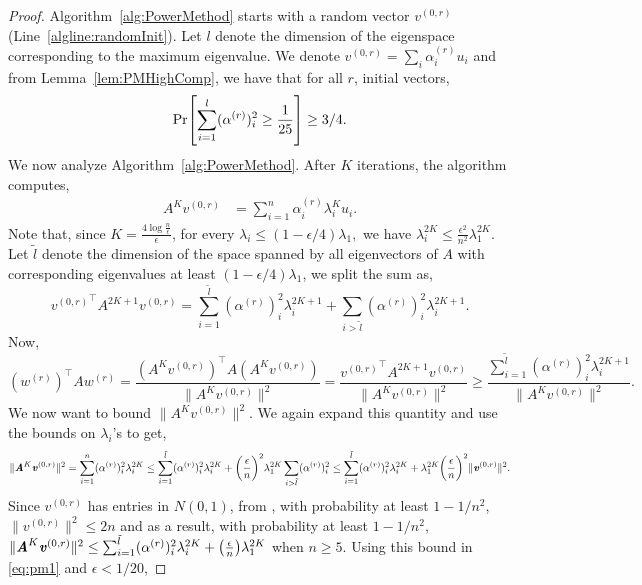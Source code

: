 \documentclass[11pt]{article}
\let\originalleft\left
\let\originalright\right
\renewcommand{\left}{\mathopen{}\mathclose\bgroup\originalleft}
\renewcommand{\right}{\aftergroup\egroup\originalright}
\newcommand\uu{\boldsymbol{\mathit{u}}}
\newcommand\vv{\boldsymbol{\mathit{v}}}
\newcommand\ww{\boldsymbol{\mathit{w}}}
\renewcommand\AA{\boldsymbol{\mathit{A}}}
\begin{document}
\PowerMethod*
\begin{proof}

Algorithm~\ref{alg:PowerMethod} starts with a random vector $\vv^{(0,r)}$ (Line~\ref{algline:randomInit}). Let $l$ denote the dimension of the eigenspace corresponding to the maximum eigenvalue. We denote $\vv^{(0,r)} = \sum_i \alpha^{(r)}_i \uu_i$ and from Lemma~\ref{lem:PMHighComp}, we have that for all $r$, initial vectors,
\[
\Pr\left[\sum_{i=1}^l(\alpha^{(r)})_i^2 \geq \frac{1}{25}\right]\geq 3/4.
\]
We now analyze Algorithm~\ref{alg:PowerMethod}. After $K$ iterations, the algorithm computes,
\begin{align*}
\AA^K\vv^{(0,r)} & =\sum_{i =1 }^{n}\alpha^{(r)}_i \lambda_i^K \uu_i .
\end{align*}
  Note that, since $K = \frac{4\log \frac{n}{\epsilon}}{\epsilon}$, for every $\lambda_i \leq (1-\epsilon/4)\lambda_1,$ we have $\lambda_i^{2K} \leq \frac{\epsilon^{2}}{n^{2}}\lambda_1^{2K}$. Let $\tilde{l}$ denote the dimension of the space spanned by all eigenvectors of $\AA$ with corresponding eigenvalues at least $(1-\epsilon/4)\lambda_1$, we split the sum as,
\[
{\vv^{(0,r)}}^{\top}\AA^{2K+1}\vv^{(0,r)}  =\sum_{i =1 }^{\tilde{l}}(\alpha^{(r)})_i^2 \lambda_i^{2K+1} + \sum_{i >\tilde{l}}(\alpha^{(r)})_i^2 \lambda_i^{2K+1} .
\]
 Now,
 \begin{equation}\label{eq:pm1}
 (\ww^{(r)})^{\top}\AA\ww^{(r)} = \frac{(\AA^K\vv^{(0,r)})^{\top}\AA(\AA^K\vv^{(0,r)})}{\|\AA^K\vv^{(0,r)}\|^2}  = \frac{{\vv^{(0,r)}}^{\top}\AA^{2K+1}\vv^{(0,r)}}{\|\AA^K\vv^{(0,r)}\|^2}  \geq \frac{\sum_{i =1 }^{\tilde{l}}(\alpha^{(r)})^2_i \lambda_i^{2K+1} }{\|\AA^K\vv^{(0,r)}\|^2}.
 \end{equation}
We now want to bound $\|\AA^K\vv^{(0,r)}\|^2$. We again expand this quantity and use the bounds on $\lambda_i$'s to get, 
\[
\|\AA^K\vv^{(0,r)}\|^2 = \sum_{i =1 }^{n}(\alpha^{(r)})_i^2 \lambda_i^{2K} \leq \sum_{i =1 }^{\tilde{l}}(\alpha^{(r)})_i^2 \lambda_i^{2K} + \left(\frac{\epsilon}{n}\right)^{2}\lambda_1^{2K}\sum_{i>\tilde{l}}(\alpha^{(r)})_i^2 \leq \sum_{i =1 }^{\tilde{l}}(\alpha^{(r)})_i^2 \lambda_i^{2K}+\lambda_1^{2K}\left(\frac{\epsilon}{n}\right)^2\|\vv^{(0,r)}\|^2.
\]
Since $\vv^{(0,r)}$ has entries in $N(0,1)$, from , with probability at least $1-1/n^2$, $\|\vv^{(0,r)}\|^2 \leq 2n$ and as a result, with probability at least $1-1/n^2$, $\|\AA^K\vv^{(0,r)}\|^2 \leq \sum_{i =1 }^{\tilde{l}}(\alpha^{(r)})_i^2 \lambda_i^{2K}+\left(\frac{\epsilon}{n}\right)\lambda_1^{2K}$ when $n\geq 5$. Using this bound in \eqref{eq:pm1} and $\epsilon<1/20$,

\end{proof}
\end{document}
